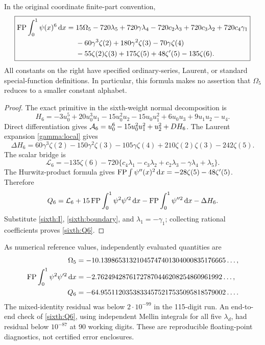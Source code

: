 \begin{theorem}
\label{sixth:main}
In the original coordinate finite-part convention,
\begin{equation}\label{sixth:Q6}
 \boxed{\begin{aligned}
 \operatorname{FP}\int_0^1\psi(x)^6\,\mathrm d x={}&
 15\Omega_5-720\lambda_5+720\gamma\lambda_4
 -720c_2\lambda_3+720c_3\lambda_2+720c_4\gamma_1\\
 &-60\gamma^3\zeta(2)+180\gamma^2\zeta(3)-70\gamma\zeta(4)\\
 &-55\zeta(2)\zeta(3)+175\zeta(5)
                  +48\zeta'(5)-135\zeta(6).
 \end{aligned}}
\end{equation}
All constants on the right have specified ordinary-series, Laurent,
or standard special-function definitions.  In particular, this
formula makes no assertion that $\Omega_5$ reduces to a smaller
constant alphabet.
\end{theorem}
\begin{proof}
The exact primitive in the sixth-weight normal decomposition is
\begin{equation}\label{sixth:H6}
 H_6=-3u_0^5+20u_0^3u_1-15u_0^2u_2-15u_0u_1^2
                       +6u_0u_3+9u_1u_2-u_4.
\end{equation}
Direct differentiation gives
$\mathcal A_6=u_0^6-15u_0^2u_1^2+u_2^2+DH_6$.
The Laurent expansion \eqref{gamma:local} gives
\begin{equation}\label{sixth:boundary}
 \Delta H_6=60\gamma^3\zeta(2)-150\gamma^2\zeta(3)
 -105\gamma\zeta(4)+210\zeta(2)\zeta(3)-242\zeta(5).
\end{equation}
The scalar bridge is
\[
 \mathcal L_6=-135\zeta(6)
  -720\{c_4\lambda_1-c_3\lambda_2+c_2\lambda_3
                              -\gamma\lambda_4+\lambda_5\}.
\]
The Hurwitz-product formula gives
$\operatorname{FP}\int\psi''(x)^2\,\mathrm d x=-28\zeta(5)-48\zeta'(5)$.
Therefore
\[
 Q_6=\mathcal L_6+15\operatorname{FP}\int_0^1\psi^2\psi'^2\,\mathrm d x
                    -\operatorname{FP}\int_0^1\psi''^2\,\mathrm d x-\Delta H_6.
\]
Substitute \eqref{sixth:I}, \eqref{sixth:boundary}, and
$\lambda_1=-\gamma_1$; collecting rational coefficients proves
\eqref{sixth:Q6}.
\end{proof}

As numerical reference values, independently evaluated quantities are
\begin{align*}
 \Omega_5&=-10.13986531321045747401304000835176665\ldots,\\
 \operatorname{FP}\int_0^1\psi^2\psi'^2\,\mathrm d x
   &=-2.76249428761727870446208254860961992\ldots,\\
 Q_6&=-64.95511203538334575217535095818579002\ldots.
\end{align*}
The mixed-identity residual was below $2\cdot10^{-99}$ in the
115-digit run.  An end-to-end check of \eqref{sixth:Q6}, using
independent Mellin integrals for all five $\lambda_d$, had residual
below $10^{-87}$ at 90 working digits.  These are reproducible
floating-point diagnostics, not certified error enclosures.

